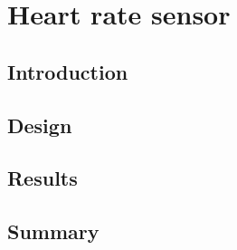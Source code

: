 \chapter{Heart rate sensor}\label{ch:heartRate}

\section{Introduction} \label{sec:heartIntro}


\section{Design} \label{sec:heartDesign}

\section{Results} \label{sec:heartResults}

\section{Summary}\label{sec:temp_summary}


